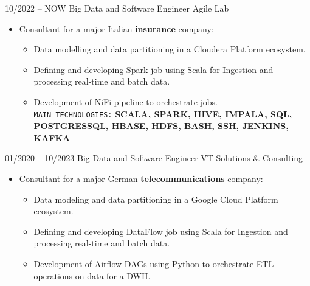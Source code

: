 \documentclass[9pt]{developercv} %
\begin{document}
    \vspace{-10 pt}
    \begin{entrylist}
        \entry
        {10/2022 -- NOW}
        {Big Data and Software Engineer}
        {Agile Lab}
        {\vspace{-10pt}
            \begin{itemize}[noitemsep,topsep=0pt,parsep=0pt,partopsep=0pt, leftmargin=-1pt]
                \item {Consultant for a major Italian \textbf{insurance} company:}
                \begin{itemize}[noitemsep,topsep=0pt,parsep=0pt,partopsep=0pt]
                    \item {Data modelling and data partitioning in a Cloudera Platform ecosystem.}
                    \item {Defining and developing Spark job using Scala for Ingestion and processing real-time and batch data.}
                    \item {Development of NiFi pipeline to orchestrate jobs.}
                    \texttt{\\MAIN TECHNOLOGIES:} \textbf{SCALA, SPARK, HIVE, IMPALA, SQL, POSTGRESSQL, HBASE, HDFS, BASH, SSH, JENKINS, KAFKA}
                \end{itemize}
            \end{itemize} }
        \entry
        {01/2020 -- 10/2023}
        {Big Data and Software Engineer}
        {VT Solutions & Consulting}
        {\vspace{-10pt}
            \begin{itemize}[noitemsep,topsep=0pt,parsep=0pt,partopsep=0pt, leftmargin=-1pt]
                \item {Consultant for a major German \textbf{telecommunications} company:}
                \begin{itemize}[noitemsep,topsep=0pt,parsep=0pt,partopsep=0pt]
                    \item {Data modeling and data partitioning in a Google Cloud Platform ecosystem.}
                    \item {Defining and developing DataFlow job using Scala for Ingestion and processing real-time and batch data.}
                    \item {Development of Airflow DAGs using Python to orchestrate ETL operations on data for a DWH.}

\end{itemize}
\end{itemize}}
\end{entrylist}
\end{document}
